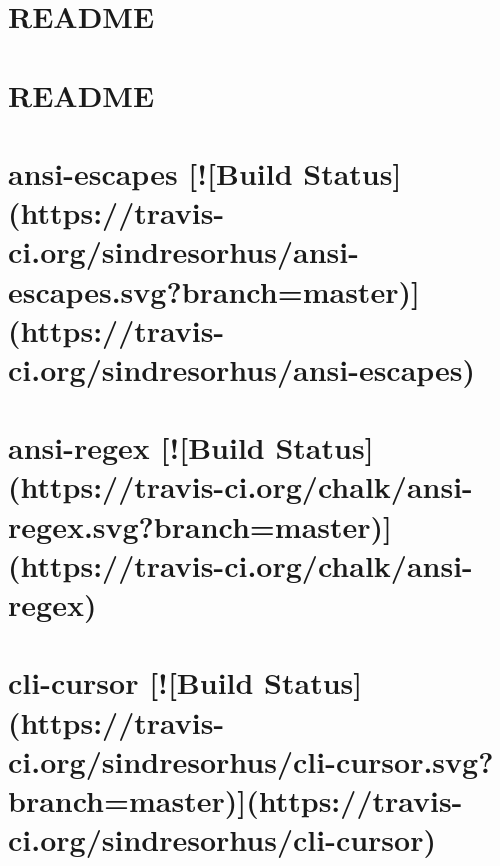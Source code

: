 \documentclass[twoside]{book}
\newcommand{\+}{\discretionary{\mbox{\scriptsize$\hookleftarrow$}}{}{}}
\begin{document}
\chapter{R\+E\+A\+D\+ME}
\label{md__c_1_workspace_demo_src_main_script_node_modules_inherits__r_e_a_d_m_e}

\chapter{R\+E\+A\+D\+ME}
\label{md__c_1_workspace_demo_src_main_script_node_modules_ini__r_e_a_d_m_e}

\chapter{ansi-\/escapes \mbox{[}!\mbox{[}Build Status\mbox{]}(https\+://travis-\/ci.org/sindresorhus/ansi-\/escapes.svg?branch=master)\mbox{]}(https\+://travis-\/ci.org/sindresorhus/ansi-\/escapes)}
\label{md__c_1_workspace_demo_src_main_script_node_modules_inquirer_node_modules_ansi-escapes_readme}

\chapter{ansi-\/regex \mbox{[}!\mbox{[}Build Status\mbox{]}(https\+://travis-\/ci.org/chalk/ansi-\/regex.svg?branch=master)\mbox{]}(https\+://travis-\/ci.org/chalk/ansi-\/regex)}
\label{md__c_1_workspace_demo_src_main_script_node_modules_inquirer_node_modules_ansi-regex_readme}

\chapter{cli-\/cursor \mbox{[}!\mbox{[}Build Status\mbox{]}(https\+://travis-\/ci.org/sindresorhus/cli-\/cursor.svg?branch=master)\mbox{]}(https\+://travis-\/ci.org/sindresorhus/cli-\/cursor)}
\label{md__c_1_workspace_demo_src_main_script_node_modules_inquirer_node_modules_cli-cursor_readme}

\end{document}
